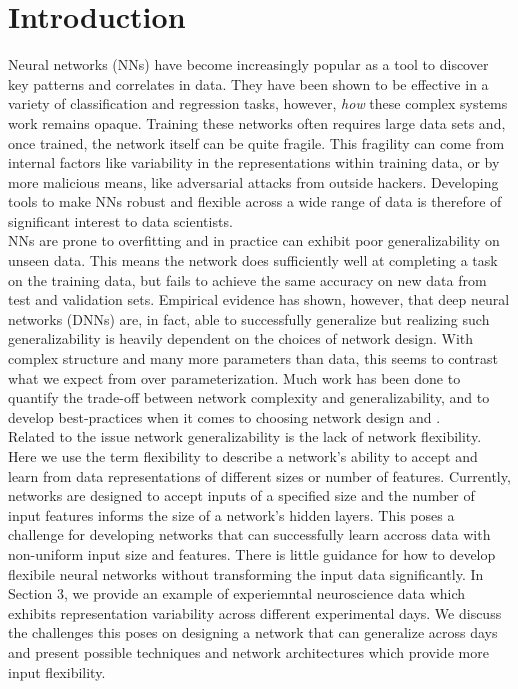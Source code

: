 \documentclass[12pt]{article}
\begin{document}
\section{Introduction}Neural networks (NNs) have become increasingly popular as a tool to discover key patterns and correlates in data. They have been shown to be effective in a variety of classification and regression tasks, however, \textit{how} these complex systems work remains opaque. Training these networks often requires large data sets and, once trained, the network itself can be quite fragile. This fragility can come from internal factors like variability in the representations within  training data, or by more malicious means, like adversarial attacks from outside hackers. Developing tools to make NNs robust and flexible across a wide range of data is therefore of significant interest to data scientists. \\
\indent NNs are prone to overfitting and in practice can exhibit poor generalizability on unseen data. This means the network does sufficiently well at completing a task on the training data, but fails to achieve the same accuracy on new data from test and validation sets. Empirical evidence has shown, however, that deep neural networks (DNNs) are, in fact, able to successfully generalize but realizing such generalizability is heavily dependent on the choices of network design. With complex structure and many more parameters than data, this seems to contrast what we expect from over parameterization.  Much work has been done to quantify the trade-off between network complexity and generalizability, and to develop best-practices when it comes to choosing network design  \cite{zhang,genNN,drop_over} and \cite{batchgen}. \\
\indent Related to the issue network generalizability is the lack of network flexibility. Here we use the term flexibility to describe a network's ability to accept and learn from data representations of different sizes or number of features. Currently, networks are designed to accept inputs of a specified size and the number of input features informs the size of a network's hidden layers. This poses a challenge for developing networks that can successfully learn accross data with non-uniform input size and features.  There is little guidance for how to develop flexibile neural networks without transforming the input data significantly.  In Section 3, we provide an example of experiemntal neuroscience data which exhibits representation variability across different experimental days. We discuss the challenges this poses on designing a network that can generalize across days and present possible techniques and network architectures which provide more input flexibility. \\
\end{document}
